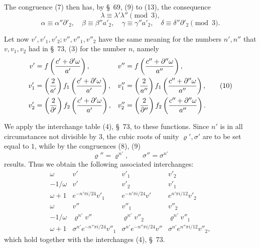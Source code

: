 \documentclass[11pt]{article}
\begin{document}
The congruence (7) then has, by \S~69, (9) to (13), the consequence
\begin{equation}
 \lambda\equiv \lambda'\lambda''\pmod 3,
\tag{8}
\end{equation}
\begin{equation}
 \alpha\equiv \alpha''\partial'_2,
 \quad \beta\equiv \beta''a'_2,
 \quad \gamma\equiv \gamma''a'_2,
 \quad \delta\equiv \delta''\partial'_2\pmod 3.
\tag{9}
\end{equation}

Let now $v',v'_1,v'_2;v'',v''_1,v''_2$ have the same meaning for the numbers $n',n''$ that $v,v_1,v_2$ had in \S~73, (3) for the number $n$, namely
\begin{equation}
\begin{aligned}
v'&=f\left({c'+\partial'\omega\over a'}\right),
&v''&=f\left({c''+\partial''\omega\over a''}\right),\\
v'_1&=\left({2\over a'}\right)f_1\left({c'+\partial'\omega\over a'}\right),
&v''_1&=\left({2\over a''}\right)f_1\left({c''+\partial''\omega\over a''}\right),\\
v'_2&=\left({2\over\partial'}\right)f_2\left({c'+\partial'\omega\over a'}\right),
&v''_2&=\left({2\over\partial''}\right)f_2\left({c''+\partial''\omega\over a''}\right).
\end{aligned}
\tag{10}
\end{equation}

We apply the interchange table (4), \S~73, to these functions. Since $n'$ is in all circumstances not divisible by $3$, the cubic roots of unity $\varrho',\sigma'$ are to be set equal to $1$, while by the congruences (8), (9)
\begin{equation}
 \varrho''=\varrho^{n'},\qquad \sigma''=\sigma^{n'}
\tag{11}
\end{equation}
results. Thus we obtain the following associated interchanges:
\begin{equation}
\begin{array}{c|ccc}
\omega&v'&v'_1&v'_2\\[0.2em]
-1/\omega&v'&v'_2&v'_1\\[0.2em]
\omega+1&e^{-n'\pi i/24}v'_1&e^{-n'\pi i/24}v'&e^{n'\pi i/12}v'_2\\[0.3em]\hline
\omega&v''&v''_1&v''_2\\[0.2em]
-1/\omega&\varrho^{n'}v''&\varrho^{n'}v''_2&\varrho^{n'}v''_1\\[0.2em]
\omega+1&\sigma^{n'}e^{-n''\pi i/24}v''_1&\sigma^{n'}e^{-n''\pi i/24}v''&\sigma^{n'}e^{n''\pi i/12}v''_2,
\end{array}
\tag{12}
\end{equation}
which hold together with the interchanges (4), \S~73.
\end{document}
